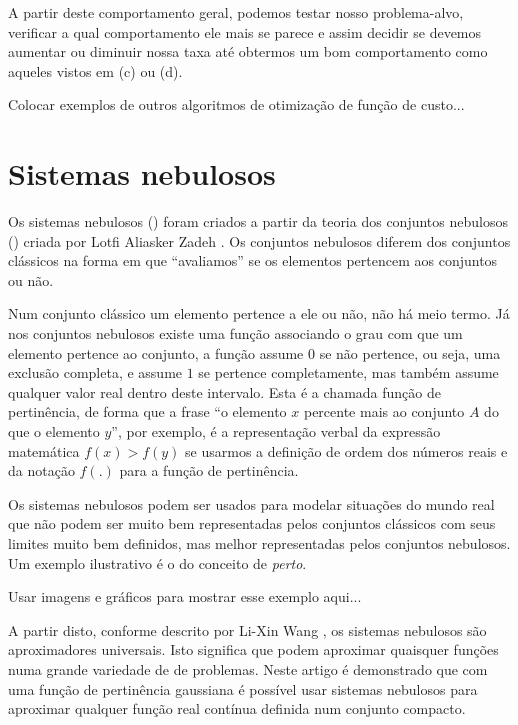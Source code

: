 A partir deste comportamento geral, podemos testar nosso problema-alvo, verificar a qual comportamento ele mais se parece e assim decidir se devemos aumentar ou diminuir nossa taxa até obtermos um bom comportamento como aqueles vistos em (c) ou (d).

Colocar exemplos de outros algoritmos de otimização de função de custo...

\section{Sistemas nebulosos}

Os sistemas nebulosos () foram criados a partir da teoria dos conjuntos nebulosos () criada por Lotfi Aliasker Zadeh \citep{fuzzy_1}. Os conjuntos nebulosos diferem dos conjuntos clássicos na forma em que ``avaliamos'' se os elementos pertencem aos conjuntos ou não. 

Num conjunto clássico um elemento pertence a ele ou não, não há meio termo. Já nos conjuntos nebulosos existe uma função associando o grau com que um elemento pertence ao conjunto, a função assume $0$ se não pertence, ou seja, uma exclusão completa, e assume $1$ se pertence completamente, mas também assume qualquer valor real dentro deste intervalo. Esta é a chamada função de pertinência, de forma que a frase ``o elemento $x$ percente mais ao conjunto $A$ do que o elemento $y$'', por exemplo, é a representação verbal da expressão matemática $f(x) > f(y)$ se usarmos a definição de ordem dos números reais e da notação $f(.)$ para a função de pertinência.

Os sistemas nebulosos podem ser usados para modelar situações do mundo real que não podem ser muito bem representadas pelos conjuntos clássicos com seus limites muito bem definidos, mas melhor representadas pelos conjuntos nebulosos. Um exemplo ilustrativo é o do conceito de \emph{perto}.

Usar imagens e gráficos para mostrar esse exemplo aqui...

A partir disto, conforme descrito por Li-Xin Wang \citep{fuzzy_2}, os sistemas nebulosos são aproximadores universais. Isto significa que podem aproximar quaisquer funções numa grande variedade de de problemas. Neste artigo é demonstrado que com uma função de pertinência gaussiana é possível usar sistemas nebulosos para aproximar qualquer função real contínua definida num conjunto compacto.